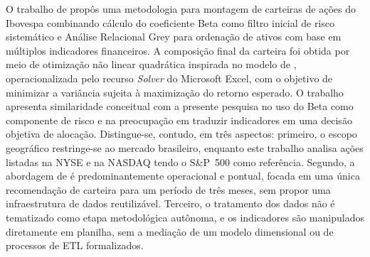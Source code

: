 O trabalho de  propôs uma metodologia para montagem de carteiras de ações do Ibovespa combinando cálculo do coeficiente Beta como filtro inicial de risco sistemático e Análise Relacional Grey \cite{deng_grey_1989} para ordenação de ativos com base em múltiplos indicadores financeiros. A composição final da carteira foi obtida por meio de otimização não linear quadrática inspirada no modelo de , operacionalizada pelo recurso \textit{Solver} do Microsoft Excel, com o objetivo de minimizar a variância sujeita à maximização do retorno esperado. O trabalho apresenta similaridade conceitual com a presente pesquisa no uso do Beta como componente de risco e na preocupação em traduzir indicadores em uma decisão objetiva de alocação. Distingue-se, contudo, em três aspectos: primeiro, o escopo geográfico restringe-se ao mercado brasileiro, enquanto este trabalho analisa ações listadas na NYSE e na NASDAQ tendo o S\&P~500 como referência. Segundo, a abordagem de  é predominantemente operacional e pontual, focada em uma única recomendação de carteira para um período de três meses, sem propor uma infraestrutura de dados reutilizável. Terceiro, o tratamento dos dados não é tematizado como etapa metodológica autônoma, e os indicadores são manipulados diretamente em planilha, sem a mediação de um modelo dimensional ou de processos de ETL formalizados.

